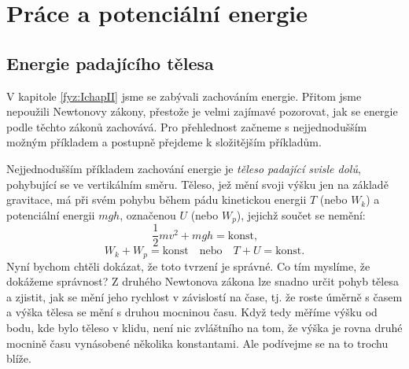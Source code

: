 \setchaptertoc
\chapter{Práce a potenciální energie}\label{fyz:chap_fey_work}

  \section{Energie padajícího tělesa}
    V kapitole \ref{fyz:IchapII} jsme se zabývali zachováním energie. Přitom jsme nepoužili 
    Newtonovy zákony, přestože je velmi zajímavé pozorovat, jak se energie podle těchto zákonů 
    zachovává. Pro přehlednost začneme s nejjednodušším možným příkladem a postupně přejdeme k 
    složitějším příkladům.
    
    Nejjednodušším příkladem zachování energie je \emph{těleso padající svisle dolů}, pohybující se 
    ve vertikálním směru. Těleso, jež mění svoji výšku jen na základě gravitace, má při svém pohybu 
    během pádu kinetickou energii \(T\) (nebo \(W_k\)) a potenciální energii \(mgh\), označenou 
    \(U\) (nebo \(W_p\)), jejichž součet se nemění:
    \begin{equation}\label{fyz:eq025}
      \frac{1}{2}mv^2 + mgh = \text{konst,}
    \end{equation}
    \begin{equation*}
      W_k + W_p = \text{konst} \quad \text{nebo} \quad T + U = \text{konst}.
    \end{equation*}
    Nyní bychom chtěli dokázat, že toto tvrzení je správné. Co tím myslíme, že dokážeme správnost? 
    Z druhého Newtonova zákona lze snadno určit pohyb tělesa a zjistit, jak se mění jeho rychlost v 
    závislostí na čase, tj. že roste úměrně s časem a výška tělesa se mění s druhou mocninou času. 
    Když tedy měříme výšku od bodu, kde bylo těleso v klidu, není nic zvláštního na tom, že výška 
    je rovna druhé mocnině času vynásobené několika konstantami. Ale podívejme se na to trochu 
    blíže.
    
